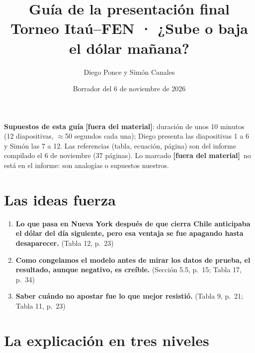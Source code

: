 \documentclass[11pt]{article}
\title{Guía de la presentación final\\\large Torneo Itaú--FEN · ¿Sube o baja el dólar mañana?}
\author{Diego Ponce y Simón Canales}
\date{Borrador del 6 de noviembre de 2026}
\newcommand{\fuera}{\textcolor{red!60!black}{\textbf{[fuera del material]}}}
\begin{document}
\maketitle

\textbf{Supuestos de esta guía} \fuera: duración de unos 10 minutos (12 diapositivas, \(\approx\)50 segundos cada una); Diego presenta las diapositivas 1 a 6 y Simón las 7 a 12. Las referencias (tabla, ecuación, página) son del informe compilado el 6 de noviembre (37 páginas). Lo marcado \fuera\ no está en el informe: son analogías o supuestos nuestros.

\section{Las ideas fuerza}
\begin{enumerate}
\item \textbf{Lo que pasa en Nueva York después de que cierra Chile anticipaba el dólar del día siguiente, pero esa ventaja se fue apagando hasta desaparecer.} (Tabla 12, p.~23)
\item \textbf{Como congelamos el modelo antes de mirar los datos de prueba, el resultado, aunque negativo, es creíble.} (Sección 5.5, p.~15; Tabla 17, p.~34)
\item \textbf{Saber cuándo no apostar fue lo que mejor resistió.} (Tabla 9, p.~21; Tabla 11, p.~23)
\end{enumerate}

\section{La explicación en tres niveles}
\end{document}
